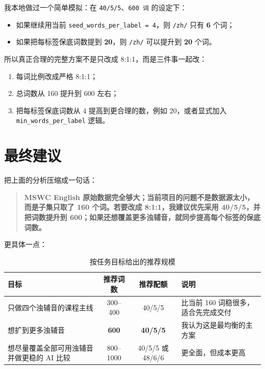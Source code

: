 \documentclass[11pt,a4paper]{ctexart}
\begin{document}
我本地做过一个简单模拟：在 \texttt{40/5/5}、\texttt{600 词} 的设定下：
\begin{itemize}[nosep]
    \item 如果继续用当前 \texttt{seed\_words\_per\_label = 4}，则 \texttt{/zh/} 只有 \textbf{6} 个词；
    \item 如果把每标签保底词数提到 \textbf{20}，则 \texttt{/zh/} 可以提升到 \textbf{20} 个词。
\end{itemize}

所以真正合理的完整方案不是只改成 8:1:1，而是三件事一起改：
\begin{enumerate}[nosep]
    \item 每词比例改成严格 8:1:1；
    \item 总词数从 160 提升到 600 左右；
    \item 把每标签保底词数从 4 提高到更合理的数，例如 20，或者显式加入 \texttt{min\_words\_per\_label} 逻辑。
\end{enumerate}

\section{最终建议}

把上面的分析压缩成一句话：

\begin{quote}
\textbf{MSWC English 原始数据完全够大；当前项目的问题不是数据源太小，而是子集只取了 160 个词。若要改成 8:1:1，我建议优先采用 40/5/5，并把词数提升到 600；如果还想覆盖更多浊辅音，就同步提高每个标签的保底词数。}
\end{quote}

更具体一点：
\begin{table}[H]
    \centering
    \caption{按任务目标给出的推荐规模}
    \label{tab:recommend}
    \begin{tabularx}{\textwidth}{>{\raggedright\arraybackslash}p{4.6cm}cc>{\raggedright\arraybackslash}X}
        \toprule
        目标 & 推荐词数 & 推荐配额 & 说明 \\
        \midrule
        只做四个浊辅音的课程主线 & 300--400 & 40/5/5 & 比当前 160 词稳很多，适合先完成交付 \\
        想扩到更多浊辅音 & \textbf{600} & \textbf{40/5/5} & 我认为这是最均衡的主方案 \\
        想尽量覆盖全部可用浊辅音并做更稳的 AI 比较 & 800--1000 & 40/5/5 或 48/6/6 & 更全面，但成本更高 \\
        \bottomrule
    \end{tabularx}
\end{table}
\end{document}
